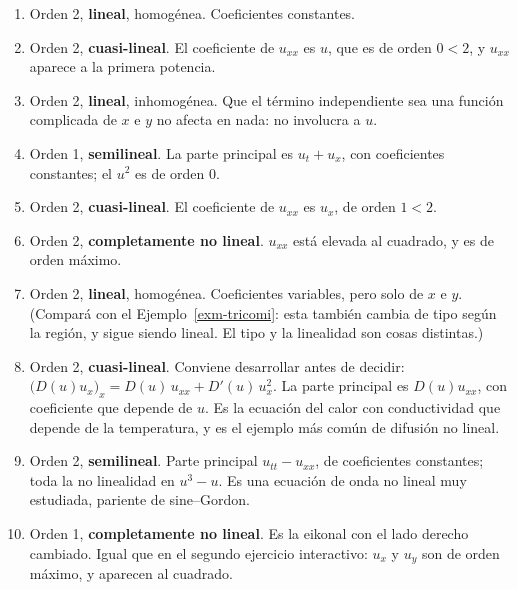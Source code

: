 \documentclass[
  spanish,
  a4paper,
]{scrbook}
\providecommand{\tightlist}{%
  \setlength{\itemsep}{0pt}\setlength{\parskip}{0pt}}
\theoremstyle{definition}
\theoremstyle{plain}
\theoremstyle{definition}
\theoremstyle{plain}
\theoremstyle{definition}
\theoremstyle{remark}
\begin{document}
\begin{tcolorbox}[enhanced jigsaw, arc=.35mm, bottomrule=.15mm, bottomtitle=1mm, breakable, colback=white, colbacktitle=quarto-callout-tip-color!10!white, colframe=quarto-callout-tip-color-frame, coltitle=black, left=2mm, leftrule=.75mm, opacityback=0, opacitybacktitle=0.6, rightrule=.15mm, title=\textcolor{quarto-callout-tip-color}{\faLightbulb}\hspace{0.5em}{Solución del Ejercicio~\ref{exr-clasificar-linealidad}}, titlerule=0mm, toprule=.15mm, toptitle=1mm]

\begin{enumerate}
\def\labelenumi{\alph{enumi}.}
\tightlist
\item
  Orden 2, \textbf{lineal}, homogénea. Coeficientes constantes.
\item
  Orden 2, \textbf{cuasi-lineal}. El coeficiente de \(u_{xx}\) es \(u\),
  que es de orden \(0 < 2\), y \(u_{xx}\) aparece a la primera potencia.
\item
  Orden 2, \textbf{lineal}, inhomogénea. Que el término independiente
  sea una función complicada de \(x\) e \(y\) no afecta en nada: no
  involucra a \(u\).
\item
  Orden 1, \textbf{semilineal}. La parte principal es \(u_t + u_x\), con
  coeficientes constantes; el \(u^2\) es de orden \(0\).
\item
  Orden 2, \textbf{cuasi-lineal}. El coeficiente de \(u_{xx}\) es
  \(u_x\), de orden \(1 < 2\).
\item
  Orden 2, \textbf{completamente no lineal}. \(u_{xx}\) está elevada al
  cuadrado, y es de orden máximo.
\item
  Orden 2, \textbf{lineal}, homogénea. Coeficientes variables, pero solo
  de \(x\) e \(y\). (Compará con el Ejemplo~\ref{exm-tricomi}: esta
  también cambia de tipo según la región, y sigue siendo lineal. El tipo
  y la linealidad son cosas distintas.)
\item
  Orden 2, \textbf{cuasi-lineal}. Conviene desarrollar antes de decidir:
  \(\big(D(u)u_x\big)_x = D(u)\,u_{xx} + D'(u)\,u_x^2\). La parte
  principal es \(D(u)u_{xx}\), con coeficiente que depende de \(u\). Es
  la ecuación del calor con conductividad que depende de la temperatura,
  y es el ejemplo más común de difusión no lineal.
\item
  Orden 2, \textbf{semilineal}. Parte principal \(u_{tt}-u_{xx}\), de
  coeficientes constantes; toda la no linealidad en \(u^3-u\). Es una
  ecuación de onda no lineal muy estudiada, pariente de sine--Gordon.
\item
  Orden 1, \textbf{completamente no lineal}. Es la eikonal con el lado
  derecho cambiado. Igual que en el segundo ejercicio interactivo:
  \(u_x\) y \(u_y\) son de orden máximo, y aparecen al cuadrado.
\end{enumerate}

\end{tcolorbox}
\end{document}

